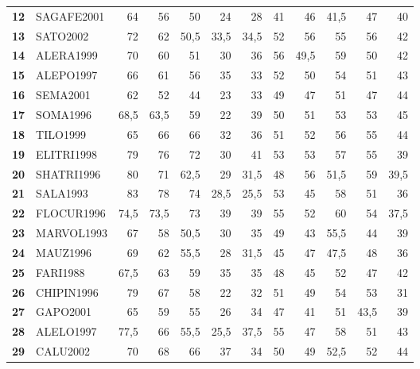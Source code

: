 \begin{landscape}
\begin{table}[p]
\begin{tabular}{>{\bfseries}cl*{10}{D{,}{,}{2.1}}}
12 & SAGAFE2001 & 64 & 56 & 50 & 24 & 28 & 41 & 46 & 41,5 & 47 & 40 \\
13 & SATO2002 & 72 & 62 & 50,5 & 33,5 & 34,5 & 52 & 56 & 55 & 56 & 42 \\
14 & ALERA1999 & 70 & 60 & 51 & 30 & 36 & 56 & 49,5 & 59 & 50 & 42 \\
15 & ALEPO1997 & 66 & 61 & 56 & 35 & 33 & 52 & 50 & 54 & 51 & 43 \\
16 & SEMA2001 & 62 & 52 & 44 & 23 & 33 & 49 & 47 & 51 & 47 & 44 \\
17 & SOMA1996 & 68,5 & 63,5 & 59 & 22 & 39 & 50 & 51 & 53 & 53 & 45 \\
18 & TILO1999 & 65 & 66 & 66 & 32 & 36 & 51 & 52 & 56 & 55 & 44 \\
19 & ELITRI1998 & 79 & 76 & 72 & 30 & 41 & 53 & 53 & 57 & 55 & 39 \\
20 & SHATRI1996 & 80 & 71 & 62,5 & 29 & 31,5 & 48 & 56 & 51,5 & 59 & 39,5 \\
21 & SALA1993 & 83 & 78 & 74 & 28,5 & 25,5 & 53 & 45 & 58 & 51 & 36 \\
22 & FLOCUR1996 & 74,5 & 73,5 & 73 & 39 & 39 & 55 & 52 & 60 & 54 & 37,5 \\
23 & MARVOL1993 & 67 & 58 & 50,5 & 30 & 35 & 49 & 43 & 55,5 & 44 & 39 \\
24 & MAUZ1996 & 69 & 62 & 55,5 & 28 & 31,5 & 45 & 47 & 47,5 & 48 & 36 \\
25 & FARI1988 & 67,5 & 63 & 59 & 35 & 35 & 48 & 45 & 52 & 47 & 42 \\
26 & CHIPIN1996 & 79 & 67 & 58 & 22 & 32 & 51 & 49 & 54 & 53 & 31 \\
27 & GAPO2001 & 65 & 59 & 55 & 26 & 34 & 47 & 41 & 51 & 43,5 & 39 \\
28 & ALELO1997 & 77,5 & 66 & 55,5 & 25,5 & 37,5 & 55 & 47 & 58 & 51 & 43 \\
29 & CALU2002 & 70 & 68 & 66 & 37 & 34 & 50 & 49 & 52,5 & 52 & 44 \\
\bottomrule
\end{tabular}
\end{table}
\newpage

\end{landscape}
